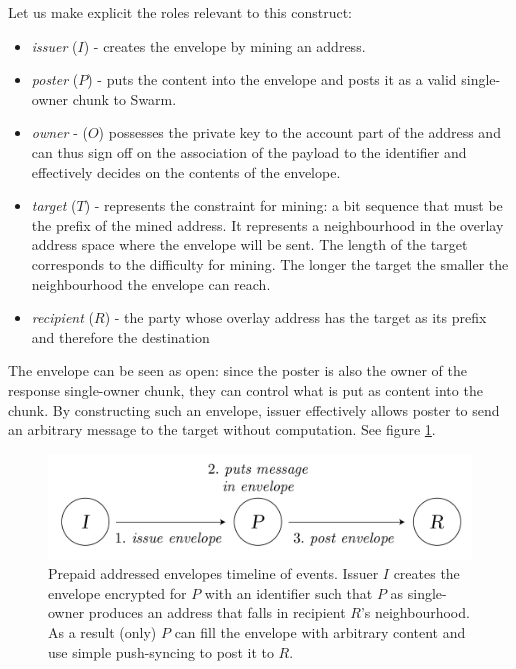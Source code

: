 Let us make explicit the roles relevant to this construct:

\begin{itemize}
\item \emph{issuer} ($I$) - creates the envelope by mining an address. 
\item \emph{poster} ($P$) - puts the content into the envelope and posts it as a valid single-owner chunk to Swarm.
\item \emph{owner} - ($O$) possesses the private key to the account part of the address and can thus sign off on the association of the payload to the identifier and effectively decides on the contents of the envelope.
\item \emph{target} ($T$) - represents the constraint for mining: a bit sequence that must be the prefix of the mined address. It represents a neighbourhood in the overlay address space where the envelope will be sent. The length of the target corresponds to the difficulty for mining. The longer the target the smaller the neighbourhood the envelope can reach.
\item \emph{recipient} ($R$) - the party whose overlay address has the target as its prefix and therefore the destination
\end{itemize}

The envelope can be seen as open: since the poster is also the owner of the response single-owner chunk, they can control what is put as content into the chunk. By constructing such an envelope, issuer effectively allows poster to send an arbitrary message to the target without computation. See figure \ref{fig:addressed-envelope-events}. 


\begin{figure}[htbp]
   \centering
   \includegraphics[width=.8\textwidth]{fig/prepaid-addressed-envelopes-events.pdf}
   \caption[Prepaid addressed envelopes timeline of events \statusgreen]{Prepaid addressed envelopes timeline of events. Issuer $I$ creates the envelope encrypted for $P$ with an identifier such that $P$ as single-owner produces an address that falls in recipient $R$'s neighbourhood. As a result (only) $P$ can fill the envelope with arbitrary content  and use  simple push-syncing to post it to $R$.}
   \label{fig:addressed-envelope-events}
\end{figure}

